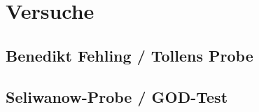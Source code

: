 
\section{Versuche}
\subsection{Benedikt Fehling / Tollens Probe}
\subsection{Seliwanow-Probe / GOD-Test}
